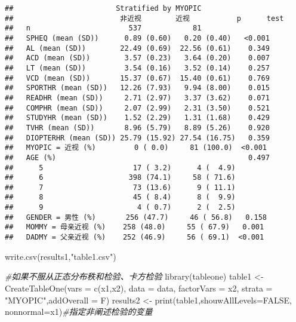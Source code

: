 \documentclass[]{ctexbook}
\newenvironment{Shaded}{\begin{snugshade}}{\end{snugshade}}
\newcommand{\AttributeTok}[1]{\textcolor[rgb]{0.77,0.63,0.00}{#1}}
\newcommand{\CommentTok}[1]{\textcolor[rgb]{0.56,0.35,0.01}{\textit{#1}}}
\newcommand{\ConstantTok}[1]{\textcolor[rgb]{0.00,0.00,0.00}{#1}}
\newcommand{\FunctionTok}[1]{\textcolor[rgb]{0.00,0.00,0.00}{#1}}
\newcommand{\NormalTok}[1]{#1}
\newcommand{\OtherTok}[1]{\textcolor[rgb]{0.56,0.35,0.01}{#1}}
\newcommand{\StringTok}[1]{\textcolor[rgb]{0.31,0.60,0.02}{#1}}
\begin{document}
\begin{verbatim}
##                        Stratified by MYOPIC
##                         非近视        近视           p      test
##   n                       537            81                     
##   SPHEQ (mean (SD))      0.89 (0.60)   0.20 (0.40)   <0.001     
##   AL (mean (SD))        22.49 (0.69)  22.56 (0.61)    0.349     
##   ACD (mean (SD))        3.57 (0.23)   3.64 (0.20)    0.007     
##   LT (mean (SD))         3.54 (0.16)   3.52 (0.14)    0.257     
##   VCD (mean (SD))       15.37 (0.67)  15.40 (0.61)    0.769     
##   SPORTHR (mean (SD))   12.26 (7.93)   9.94 (8.00)    0.015     
##   READHR (mean (SD))     2.71 (2.97)   3.37 (3.62)    0.071     
##   COMPHR (mean (SD))     2.07 (2.99)   2.31 (3.50)    0.521     
##   STUDYHR (mean (SD))    1.52 (2.29)   1.31 (1.68)    0.429     
##   TVHR (mean (SD))       8.96 (5.79)   8.89 (5.26)    0.920     
##   DIOPTERHR (mean (SD)) 25.79 (15.92) 27.54 (16.75)   0.359     
##   MYOPIC = 近视 (%)         0 ( 0.0)     81 (100.0)  <0.001     
##   AGE (%)                                             0.497     
##      5                     17 ( 3.2)      4 (  4.9)             
##      6                    398 (74.1)     58 ( 71.6)             
##      7                     73 (13.6)      9 ( 11.1)             
##      8                     45 ( 8.4)      8 (  9.9)             
##      9                      4 ( 0.7)      2 (  2.5)             
##   GENDER = 男性 (%)       256 (47.7)     46 ( 56.8)   0.158     
##   MOMMY = 母亲近视 (%)    258 (48.0)     55 ( 67.9)   0.001     
##   DADMY = 父亲近视 (%)    252 (46.9)     56 ( 69.1)  <0.001
\end{verbatim}

\begin{Shaded}
\begin{Highlighting}[]
\FunctionTok{write.csv}\NormalTok{(results1,}\StringTok{"table1.csv"}\NormalTok{)}
\end{Highlighting}
\end{Shaded}

\begin{Shaded}
\begin{Highlighting}[]
\CommentTok{\#如果不服从正态分布秩和检验、卡方检验}
\FunctionTok{library}\NormalTok{(tableone)}
\NormalTok{table1 }\OtherTok{\textless{}{-}} \FunctionTok{CreateTableOne}\NormalTok{(}\AttributeTok{vars =} \FunctionTok{c}\NormalTok{(x1,x2),}
                       \AttributeTok{data =}\NormalTok{ data,}
                       \AttributeTok{factorVars =}\NormalTok{ x2,}
                       \AttributeTok{strata =} \StringTok{"MYOPIC"}\NormalTok{,}\AttributeTok{addOverall =}\NormalTok{ F)}
\NormalTok{results2 }\OtherTok{\textless{}{-}} \FunctionTok{print}\NormalTok{(table1,}\AttributeTok{shouwAllLevels=}\ConstantTok{FALSE}\NormalTok{,}
                  \AttributeTok{nonnormal=}\NormalTok{x1)}\CommentTok{\#指定非阐述检验的变量}
\end{Highlighting}
\end{Shaded}
\end{document}
